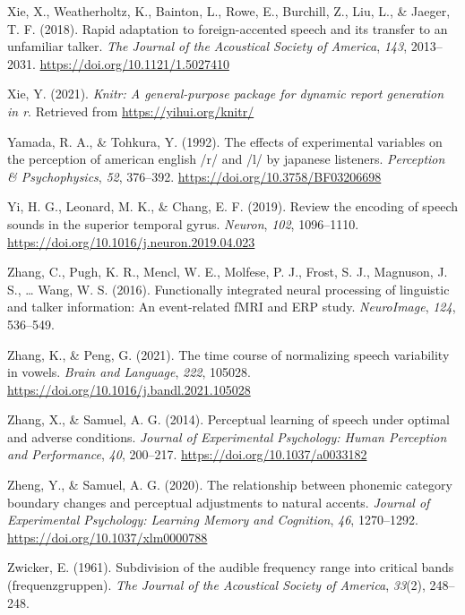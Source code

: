\documentclass[
  11pt,
  english,
  man,floatsintext]{apa6}
\newlength{\cslhangindent}
\newlength{\cslentryspacingunit} %
\newenvironment{CSLReferences}[2] %
 {%
  \setlength{\parindent}{0pt}
  \ifodd #1
  \let\oldpar\par
  \def\par{\hangindent=\cslhangindent\oldpar}
  \fi
  \setlength{\parskip}{#2\cslentryspacingunit}
 }%
 {}
\begin{document}
\begin{CSLReferences}{1}{0}
\leavevmode{}%
Xie, X., Weatherholtz, K., Bainton, L., Rowe, E., Burchill, Z., Liu, L., \& Jaeger, T. F. (2018). Rapid adaptation to foreign-accented speech and its transfer to an unfamiliar talker. \emph{The Journal of the Acoustical Society of America}, \emph{143}, 2013--2031. \url{https://doi.org/10.1121/1.5027410}

\leavevmode{}%
Xie, Y. (2021). \emph{Knitr: A general-purpose package for dynamic report generation in r}. Retrieved from \url{https://yihui.org/knitr/}

\leavevmode{}%
Yamada, R. A., \& Tohkura, Y. (1992). The effects of experimental variables on the perception of american english /r/ and /l/ by japanese listeners. \emph{Perception \& Psychophysics}, \emph{52}, 376--392. \url{https://doi.org/10.3758/BF03206698}

\leavevmode{}%
Yi, H. G., Leonard, M. K., \& Chang, E. F. (2019). Review the encoding of speech sounds in the superior temporal gyrus. \emph{Neuron}, \emph{102}, 1096--1110. \url{https://doi.org/10.1016/j.neuron.2019.04.023}

\leavevmode{}%
Zhang, C., Pugh, K. R., Mencl, W. E., Molfese, P. J., Frost, S. J., Magnuson, J. S., \ldots{} Wang, W. S. (2016). Functionally integrated neural processing of linguistic and talker information: An event-related fMRI and ERP study. \emph{NeuroImage}, \emph{124}, 536--549.

\leavevmode{}%
Zhang, K., \& Peng, G. (2021). The time course of normalizing speech variability in vowels. \emph{Brain and Language}, \emph{222}, 105028. \url{https://doi.org/10.1016/j.bandl.2021.105028}

\leavevmode{}%
Zhang, X., \& Samuel, A. G. (2014). Perceptual learning of speech under optimal and adverse conditions. \emph{Journal of Experimental Psychology: Human Perception and Performance}, \emph{40}, 200--217. \url{https://doi.org/10.1037/a0033182}

\leavevmode{}%
Zheng, Y., \& Samuel, A. G. (2020). The relationship between phonemic category boundary changes and perceptual adjustments to natural accents. \emph{Journal of Experimental Psychology: Learning Memory and Cognition}, \emph{46}, 1270--1292. \url{https://doi.org/10.1037/xlm0000788}

\leavevmode{}%
Zwicker, E. (1961). Subdivision of the audible frequency range into critical bands (frequenzgruppen). \emph{The Journal of the Acoustical Society of America}, \emph{33}(2), 248--248.

\end{CSLReferences}
\end{document}
